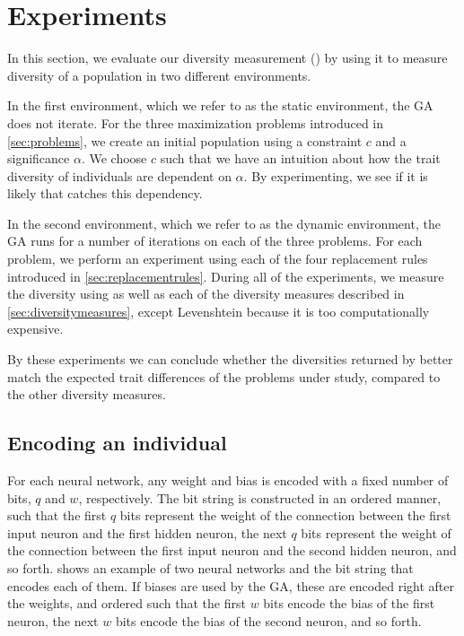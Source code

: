 \section{Experiments}\label{sec:experiments}
In this section, we evaluate our diversity measurement (\dia) by using it to measure diversity of a population in two different environments.

In the first environment, which we refer to as the static environment, the GA does not iterate.
For the three maximization problems introduced in \cref{sec:problems}, we create an initial population using a constraint $c$ and a significance $\alpha$. We choose $c$ such that we have an intuition about how the trait diversity of individuals are dependent on $\alpha$. By experimenting, we see if it is likely that \dia{} catches this dependency.

In the second environment, which we refer to as the dynamic environment, the GA runs for a number of iterations on each of the three problems. 
For each problem, we perform an experiment using each of the four replacement rules introduced in \cref{sec:replacementrules}.
During all of the experiments, we measure the diversity using \dia{} as well as each of the diversity measures described in \cref{sec:diversitymeasures}, except Levenshtein because it is too computationally expensive.

By these experiments we can conclude whether the diversities returned by \dia{} better match the expected trait differences of the problems under study, compared to the other diversity measures.

\subsection{Encoding an individual}
For each neural network, any weight and bias is encoded with a fixed number of bits, $q$ and $w$, respectively. The bit string is constructed in an ordered manner, such that the first $q$ bits represent the weight of the connection between the first input neuron and the first hidden neuron, the next $q$ bits represent the weight of the connection between the first input neuron and the second hidden neuron, and so forth.  shows an example of two neural networks and the bit string that encodes each of them. If biases are used by the GA, these are encoded right after the weights, and ordered such that the first $w$ bits encode the bias of the first neuron, the next $w$ bits encode the bias of the second neuron, and so forth. 

